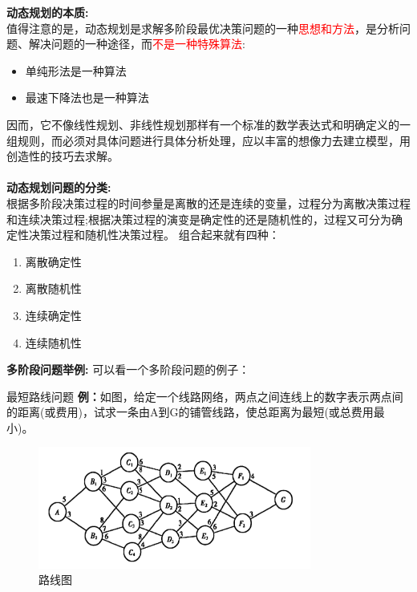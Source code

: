 	\textbf{动态规划的本质:}\\
	值得注意的是，动态规划是求解多阶段最优决策问题的一种\textcolor{red}{思想和方法}，是分析问题、解决问题的一种途径，而\textcolor{red}{不是一种特殊算法}:
	\begin{itemize}
		\item 单纯形法是一种算法
		\item 最速下降法也是一种算法
	\end{itemize}
		因而，它不像线性规划、非线性规划那样有一个标准的数学表达式和明确定义的一组规则，而必须对具体问题进行具体分析处理，应以丰富的想像力去建立模型，用创造性的技巧去求解。
\\\\\textbf{动态规划问题的分类:}\\根据多阶段决策过程的时间参量是离散的还是连续的变量，过程分为离散决策过程和连续决策过程;根据决策过程的演变是确定性的还是随机性的，过程又可分为确定性决策过程和随机性决策过程。
组合起来就有四种：
\begin{enumerate}
	\item 离散确定性
	\item 离散随机性
	\item 连续确定性
	\item 连续随机性
\end{enumerate}
\textbf{多阶段问题举例:}
可以看一个多阶段问题的例子：
\begin{exbox}{最短路线问题}{}
	\textbf{例：}如图，给定一个线路网络，两点之间连线上的数字表示两点间的距离(或费用)，试求一条由A到G的铺管线路，使总距离为最短(或总费用最小)。
	\label{eg:7.1.1}
	\begin{figure}[H]
        \centering
        \includegraphics[width=0.8\textwidth]{./image/29.png}
        \caption{路线图}
        \label{fig:Chapter4_Temporary_Pavilion_1}
    \end{figure}
\end{exbox}
